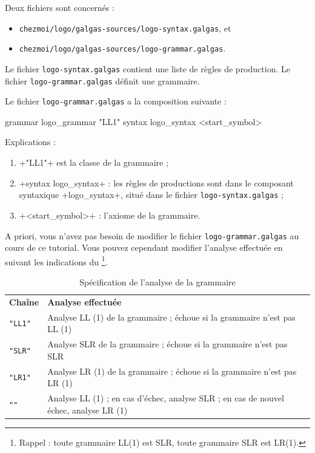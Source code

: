 Deux fichiers sont concernés :
\begin{itemize}
  \item \texttt{chezmoi/logo/galgas-sources/logo-syntax.galgas}, et
  \item \texttt{chezmoi/logo/galgas-sources/logo-grammar.galgas}.
\end{itemize}

Le fichier \texttt{logo-syntax.galgas} contient une liste de règles de production. Le fichier \texttt{logo-grammar.galgas} définit une grammaire.

Le fichier \texttt{logo-grammar.galgas} a la composition suivante :

\begin{galgas}
grammar logo_grammar "LL1" {
  syntax logo_syntax
  <start_symbol>
}
\end{galgas}

Explications :
\begin{enumerate}
  \item \ggs+"LL1"+ est la classe de la grammaire ;
  \item \ggs+syntax logo_syntax+ : les règles de productions sont dans le composant syntaxique \ggs+logo_syntax+, situé dans le fichier \texttt{logo-syntax.galgas} ; 
  \item \ggs+<start_symbol>+ : l'axiome de la grammaire.
\end{enumerate}

A priori, vous n'avez pas besoin de modifier le fichier \texttt{logo-grammar.galgas} au cours de ce tutorial. Vous pouvez cependant modifier l'analyse effectuée en suivant les indications du \footnote{Rappel : toute grammaire LL(1) est SLR, toute grammaire SLR est LR(1).}.

\begin{table}[t]
  \centering
  \begin{tabular}{ll}
    \textbf{Chaîne} & \textbf{Analyse effectuée} \\
    \texttt{"LL1"} & Analyse LL (1) de la grammaire ; échoue si la grammaire n'est pas LL (1) \\
    \texttt{"SLR"} & Analyse SLR de la grammaire ; échoue si la grammaire n'est pas SLR \\
    \texttt{"LR1"} & Analyse LR (1) de la grammaire ; échoue si la grammaire n'est pas LR (1) \\
    \texttt{""} & Analyse LL (1) ; en cas d'échec, analyse SLR ; en cas de nouvel échec, analyse LR (1) \\
  \end{tabular}
  \caption{Spécification de l'analyse de la grammaire}
  \ligne
\end{table}



